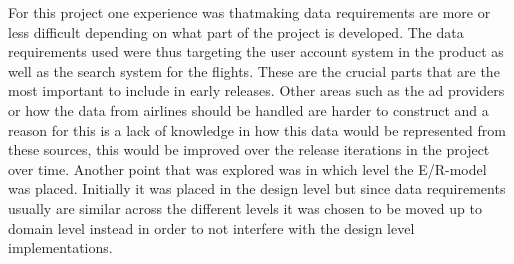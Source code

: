 For this project one experience was thatmaking data requirements are more or less difficult depending on what part of the project is developed. The data requirements used were thus targeting the user
account system in the product as well as the search system for the flights. These are the crucial parts that are the most important to include in early releases.
Other areas such as the ad providers or how the data from airlines should be handled are harder to construct and a reason for this is a lack of knowledge in
how this data would be represented from these sources, this would be improved over the release iterations in the project over time. Another point that was explored was in which level the E/R-model was placed.
Initially it was placed in the design level but since data requirements usually are similar across the different levels it was chosen to be moved up to domain level instead in order to not interfere with the design level implementations.
